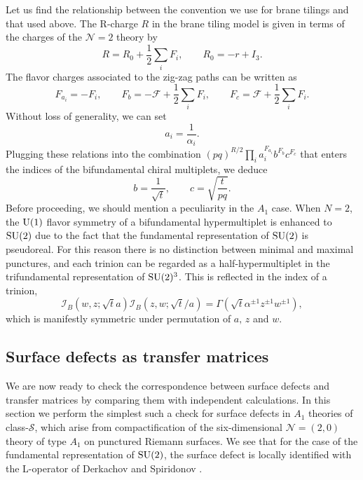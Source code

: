 Let us find the relationship between the convention we use for brane
tilings and that used above. The R-charge $R$ in the brane tiling
model is given in terms of the charges of the $\mathcal{N}=2$ theory
by
\begin{equation}
    R  =  R_{0}  +  \frac{1}{2}\sum_{i}F_{i},
      \qquad  R_{0}  =  -r+I_{3}.
\end{equation}
The flavor charges associated to the zig-zag paths can be written
as
\begin{equation}
    F_{a_{i}}  =  -F_{i},
      \qquad  F_{b}  =  -\mathcal{F}+\frac{1}{2}\sum_{i}F_{i},
      \qquad  F_{c}  =  \mathcal{F}+\frac{1}{2}\sum_{i}F_{i}.
\end{equation}
Without loss of generality, we can set
\begin{equation}
    a_{i}  =  \frac{1}{\alpha_{i}}.
\end{equation}
Plugging these relations into the combination $(pq)^{R/2}\prod_{i}a_{i}^{F_{a_{i}}}b^{F_{b}}c^{F_{c}}$
that enters the indices of the bifundamental chiral multiplets, we
deduce
\begin{equation}
    b  =  \frac{1}{\sqrt{t}},
      \qquad  c  =  \sqrt{\frac{t}{pq}}.
  \label{eq:relation_bc}
\end{equation}
Before proceeding, we should mention a peculiarity in the $A_{1}$
case. When $N=2$, the $\mathrm{U}(1)$ flavor symmetry of a bifundamental hypermultiplet
is enhanced to $\mathrm{SU}(2)$ due to the fact that the fundamental representation
of $\mathrm{SU}(2)$ is pseudoreal. For this reason there is no distinction
between minimal and maximal punctures, and each trinion can be regarded
as a half-hypermultiplet in the trifundamental representation of $\mathrm{SU}(2)^{3}$.
This is reflected in the index of a trinion,
\begin{equation}
    \mathcal{I}_{B}(w,z;\sqrt{t}a)\mathcal{I}_{B}(z,w;\sqrt{t}/a)
      =
        \Gamma(\sqrt{t}\alpha^{\pm1}z^{\pm1}w^{\pm1}),
\end{equation}
which is manifestly symmetric under permutation of $a,\,z$ and $w$.








\subsection{Surface defects as transfer matrices}
\label{sec:surface_defects}


We are now ready to check the correspondence between surface defects and transfer matrices
by comparing them with independent calculations. In this section we
perform the simplest such a check for surface defects in $A_{1}$ theories
of class-$\mathcal{S}$,
which arise from compactification
of the six-dimensional $\mathcal{N}=(2,0)$ theory of type $A_{1}$
on punctured Riemann surfaces.
We see that for the case of the fundamental representation of $\mathrm{SU}(2)$,
the surface defect is locally identified with the L-operator of
Derkachov and Spiridonov \cite{Derkachov:2012iv}.


